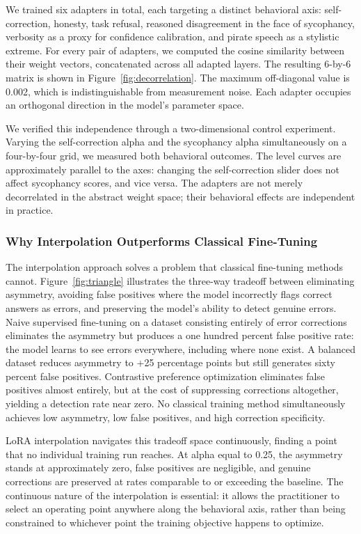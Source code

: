 \documentclass[11pt,a4paper]{article}
\begin{document}
We trained six adapters in total, each targeting a distinct behavioral axis: self-correction, honesty, task refusal, reasoned disagreement in the face of sycophancy, verbosity as a proxy for confidence calibration, and pirate speech as a stylistic extreme. For every pair of adapters, we computed the cosine similarity between their weight vectors, concatenated across all adapted layers. The resulting 6-by-6 matrix is shown in Figure~\ref{fig:decorrelation}. The maximum off-diagonal value is 0.002, which is indistinguishable from measurement noise. Each adapter occupies an orthogonal direction in the model's parameter space.

We verified this independence through a two-dimensional control experiment. Varying the self-correction alpha and the sycophancy alpha simultaneously on a four-by-four grid, we measured both behavioral outcomes. The level curves are approximately parallel to the axes: changing the self-correction slider does not affect sycophancy scores, and vice versa. The adapters are not merely decorrelated in the abstract weight space; their behavioral effects are independent in practice.

\subsubsection{Why Interpolation Outperforms Classical Fine-Tuning}

The interpolation approach solves a problem that classical fine-tuning methods cannot. Figure~\ref{fig:triangle} illustrates the three-way tradeoff between eliminating asymmetry, avoiding false positives where the model incorrectly flags correct answers as errors, and preserving the model's ability to detect genuine errors. Naive supervised fine-tuning on a dataset consisting entirely of error corrections eliminates the asymmetry but produces a one hundred percent false positive rate: the model learns to see errors everywhere, including where none exist. A balanced dataset reduces asymmetry to +25 percentage points but still generates sixty percent false positives. Contrastive preference optimization eliminates false positives almost entirely, but at the cost of suppressing corrections altogether, yielding a detection rate near zero. No classical training method simultaneously achieves low asymmetry, low false positives, and high correction specificity.

LoRA interpolation navigates this tradeoff space continuously, finding a point that no individual training run reaches. At alpha equal to 0.25, the asymmetry stands at approximately zero, false positives are negligible, and genuine corrections are preserved at rates comparable to or exceeding the baseline. The continuous nature of the interpolation is essential: it allows the practitioner to select an operating point anywhere along the behavioral axis, rather than being constrained to whichever point the training objective happens to optimize.
\end{document}
